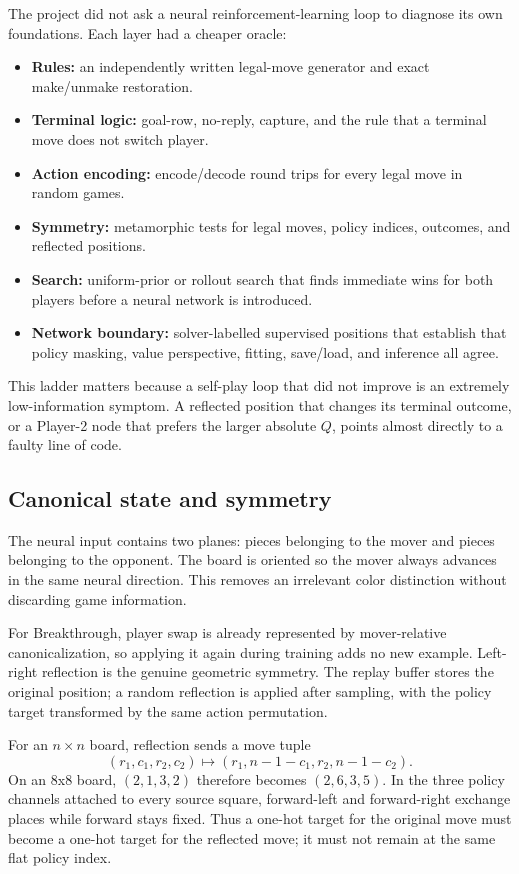 \documentclass[10.5pt,letterpaper]{article}
\begin{document}
The project did not ask a neural reinforcement-learning loop to diagnose its
own foundations. Each layer had a cheaper oracle:
\begin{itemize}
  \item \textbf{Rules:} an independently written legal-move generator and exact
        make/unmake restoration.
  \item \textbf{Terminal logic:} goal-row, no-reply, capture, and the rule that
        a terminal move does not switch player.
  \item \textbf{Action encoding:} encode/decode round trips for every legal move
        in random games.
  \item \textbf{Symmetry:} metamorphic tests for legal moves, policy indices,
        outcomes, and reflected positions.
  \item \textbf{Search:} uniform-prior or rollout search that finds immediate
        wins for both players before a neural network is introduced.
  \item \textbf{Network boundary:} solver-labelled supervised positions that
        establish that policy masking, value perspective, fitting, save/load,
        and inference all agree.
\end{itemize}

This ladder matters because a self-play loop that did not improve is an
extremely low-information symptom. A reflected position that changes its
terminal outcome, or a Player-2 node that prefers the larger absolute $Q$,
points almost directly to a faulty line of code.

\subsection{Canonical state and symmetry}

The neural input contains two planes: pieces belonging to the mover and pieces
belonging to the opponent. The board is oriented so the mover always advances
in the same neural direction. This removes an irrelevant color distinction
without discarding game information.

For Breakthrough, player swap is already represented by mover-relative
canonicalization, so applying it again during training adds no new example.
Left-right reflection is the genuine geometric symmetry. The replay buffer
stores the original position; a random reflection is applied after sampling,
with the policy target transformed by the same action permutation.

For an $n\times n$ board, reflection sends a move tuple
\[
  (r_1,c_1,r_2,c_2)
  \longmapsto
  (r_1,n-1-c_1,r_2,n-1-c_2).
\]
On an 8x8 board, $(2,1,3,2)$ therefore becomes $(2,6,3,5)$. In the three
policy channels attached to every source square, forward-left and
forward-right exchange places while forward stays fixed. Thus a one-hot target
for the original move must become a one-hot target for the reflected move; it
must not remain at the same flat policy index.
\end{document}
